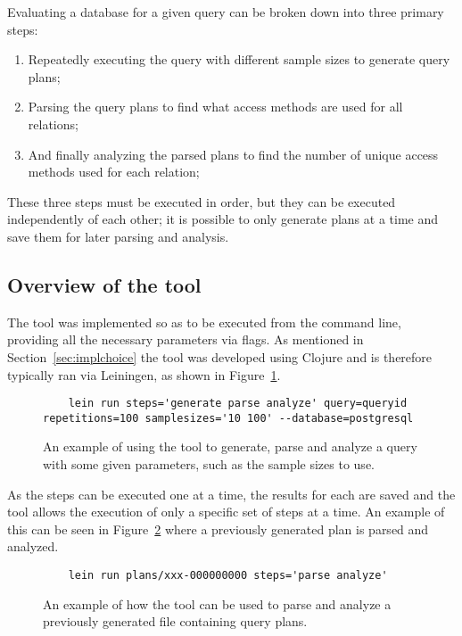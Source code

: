 Evaluating a database for a given query can be broken down into three primary steps:
\begin{enumerate}
\item Repeatedly executing the query with different sample sizes to generate
  query plans;
\item Parsing the query plans to find what access methods are used for all
  relations;
\item And finally analyzing the parsed plans to find the number of unique access
  methods used for each relation;
\end{enumerate}

These three steps must be executed in order, but they can be executed
independently of each other; it is possible to only generate plans at a time and
save them for later parsing and analysis.

\subsection{Overview of the tool}
The tool was implemented so as to be executed from the command line, providing
all the necessary parameters via flags. As mentioned in
Section~\ref{sec:implchoice} the tool was developed using Clojure and is
therefore typically ran via Leiningen, as shown in Figure~\ref{fig:cmd:runtool1}.

\begin{figure}[ht]
  \begin{verbatim}
    lein run steps='generate parse analyze' query=queryid repetitions=100 samplesizes='10 100' --database=postgresql
  \end{verbatim}
  \caption[Using the tool to generate, parse and analyze a query]{An example of
    using the tool to generate, parse and analyze a query with some given
    parameters, such as the sample sizes to use.}\label{fig:cmd:runtool1}
\end{figure}

As the steps can be executed one at a time, the results for each are saved and
the tool allows the execution of only a specific set of steps at a time. An
example of this can be seen in Figure~\ref{fig:cmd:runtool2} where a previously
generated plan is parsed and analyzed.

\begin{figure}[ht]
  \begin{verbatim}
    lein run plans/xxx-000000000 steps='parse analyze'
  \end{verbatim}
  \caption[Using the tool to parse and analyze a previously generated plan]{An
    example of how the tool can be used to parse and analyze a previously
    generated file containing query plans.}\label{fig:cmd:runtool2}
\end{figure}


